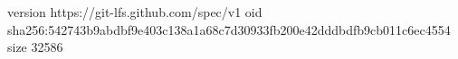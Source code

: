 version https://git-lfs.github.com/spec/v1
oid sha256:542743b9abdbf9e403c138a1a68c7d30933fb200e42dddbdfb9cb011c6ec4554
size 32586

